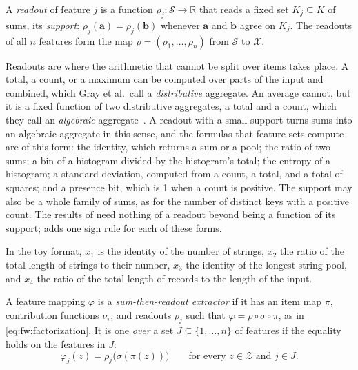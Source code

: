 \label{def:fw:readout}
{
A \emph{readout} of feature $j$ is a function $\rho_j: \mathcal{S} \to \mathbb{R}$ that reads a fixed set
$K_j \subseteq K$ of sums, its \emph{support}: $\rho_j(\mathbf{a}) = \rho_j(\mathbf{b})$ whenever $\mathbf{a}$ and
$\mathbf{b}$ agree on $K_j$. The readouts of all $n$ features form the map $\rho = (\rho_1, \dots, \rho_n)$ from
$\mathcal{S}$ to $\mathcal{X}$.
}

\noindent Readouts are where the arithmetic that cannot be split over items takes place. A total, a count, or a
maximum can be computed over parts of the input and combined, which Gray et al.\ call a \emph{distributive}
aggregate. An average cannot, but it is a fixed function of two distributive aggregates, a total and a count, which
they call an \emph{algebraic} aggregate~\cite{gray1997data}. A readout with a small support turns sums into an
algebraic aggregate in this sense, and the formulas that feature sets compute are of this form: the identity, which
returns a sum or a pool; the ratio of two sums; a bin of a histogram divided by the histogram's total; the entropy of
a histogram; a standard deviation, computed from a count, a total, and a total of squares; and a presence bit, which
is 1 when a count is positive. The support may also be a whole family of sums, as for the number of distinct keys
with a positive count. The results of  need nothing of a readout beyond being a function of
its support;  adds one sign rule for each of these forms.
\begin{runex}
In the toy format, $x_1$ is the identity of the number of strings, $x_2$ the ratio of the total length of strings to
their number, $x_3$ the identity of the longest-string pool, and $x_4$ the ratio of the total length of records to the
length of the input.
\end{runex}

\label{def:fw:extractor}
{
A feature mapping $\varphi$ is a \emph{sum-then-readout extractor} if it has an item map $\pi$, contribution
functions $\nu_\tau$, and readouts $\rho_j$ such that $\varphi = \rho \circ \sigma \circ \pi$, as in
\eqref{eq:fw:factorization}. It is one \emph{over} a set $J \subseteq \{1, \dots, n\}$ of features if the equality
holds on the features in $J$:
\begin{equation}
  \label{eq:fw:extractor}
  \varphi_j(z) = \rho_j\big(\sigma(\pi(z))\big) \qquad \text{for every } z \in \mathcal{Z} \text{ and } j \in J.
\end{equation}
}

